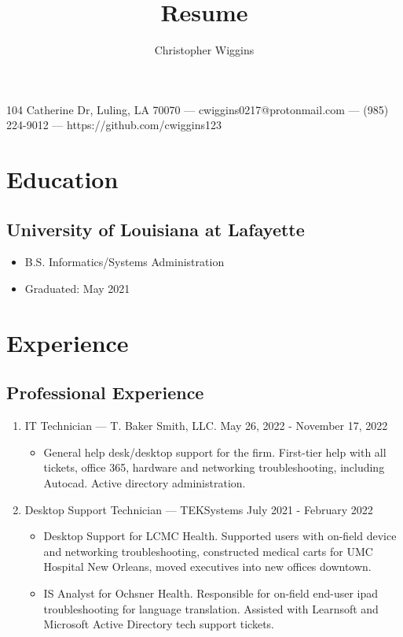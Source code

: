 \documentclass{article}
\makeatletter
\renewcommand{\maketitle}{
    \begin{center}
    {\huge\bfseries\theauthor}
    \vspace{.25em}


    104 Catherine Dr, Luling, LA 70070 --- cwiggins0217@protonmail.com --- (985) 224-9012 --- https://github.com/cwiggins123
    \end{center}
}
\makeatother
\begin{document}
\title{Resume}
\author{Christopher Wiggins}
\maketitle

\section{Education}
\subsection{University of Louisiana at Lafayette}

\begin{itemize}
    \item B.S. Informatics/Systems Administration
    \item Graduated: May 2021
\end{itemize}

\section{Experience}
\subsection{Professional Experience}
\begin{enumerate}
  \item IT Technician --- T. Baker Smith, LLC. May 26, 2022 - November 17, 2022
    \begin{itemize}
	    \item General help desk/desktop support for the firm. First-tier help with all tickets, office 365, hardware and networking troubleshooting, including Autocad. Active directory administration.
    \end{itemize}
\item Desktop Support Technician --- TEKSystems July 2021 - February 2022
    \begin{itemize}
        \item Desktop Support for LCMC Health. Supported users with on-field device and networking troubleshooting, constructed medical carts for UMC Hospital New Orleans, moved executives into new offices downtown.
		\item IS Analyst for Ochsner Health. Responsible for on-field end-user ipad troubleshooting for language translation. Assisted with Learnsoft and Microsoft Active Directory tech support tickets.
    \end{itemize}
\end{enumerate}
\end{document}
